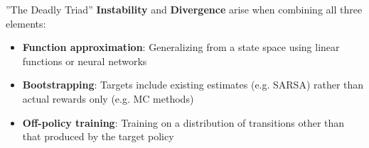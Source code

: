 \documentclass[ignorenonframetext,xcolor=x11names]{beamer}
\begin{document}


\begin{frame}[label=full]{''The Deadly Triad''}
\textbf{Instability} and \textbf{Divergence} arise when combining all three elements:
\begin{itemize}
\item \textbf{Function approximation}: Generalizing from a state space using linear functions or neural networks
\item \textbf{Bootstrapping}: Targets include existing estimates (e.g. SARSA) rather than actual rewards only (e.g. MC methods)
\item \textbf{Off-policy training}: Training on a distribution of transitions other than that produced by the target policy
\end{itemize}
\end{frame}
\end{document}
